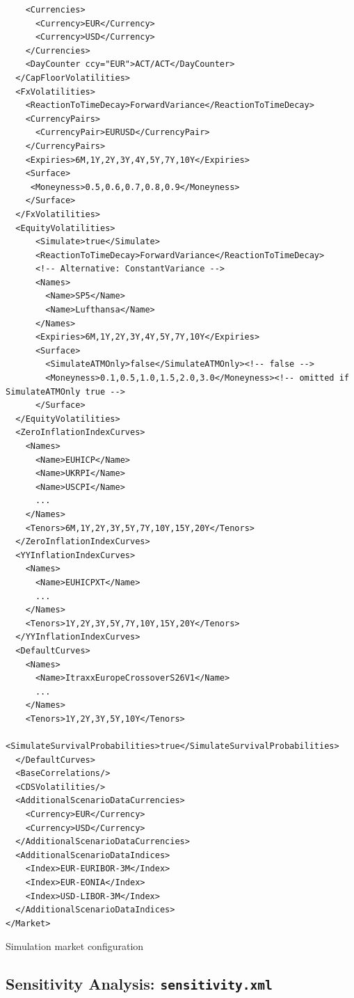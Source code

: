\documentclass[12pt, a4paper]{article}
\newenvironment{longlisting}{\captionsetup{type=listing}}{}
\begin{document}
\begin{longlisting}
\begin{verbatim}
    <Currencies>
      <Currency>EUR</Currency>
      <Currency>USD</Currency>
    </Currencies>
    <DayCounter ccy="EUR">ACT/ACT</DayCounter>
  </CapFloorVolatilities>
  <FxVolatilities>
    <ReactionToTimeDecay>ForwardVariance</ReactionToTimeDecay>
    <CurrencyPairs>
      <CurrencyPair>EURUSD</CurrencyPair>
    </CurrencyPairs>
    <Expiries>6M,1Y,2Y,3Y,4Y,5Y,7Y,10Y</Expiries>
    <Surface>
     <Moneyness>0.5,0.6,0.7,0.8,0.9</Moneyness>
    </Surface>
  </FxVolatilities>
  <EquityVolatilities>
      <Simulate>true</Simulate>
      <ReactionToTimeDecay>ForwardVariance</ReactionToTimeDecay>
      <!-- Alternative: ConstantVariance -->
      <Names>
        <Name>SP5</Name>
        <Name>Lufthansa</Name>
      </Names>
      <Expiries>6M,1Y,2Y,3Y,4Y,5Y,7Y,10Y</Expiries>
      <Surface>
        <SimulateATMOnly>false</SimulateATMOnly><!-- false -->
        <Moneyness>0.1,0.5,1.0,1.5,2.0,3.0</Moneyness><!-- omitted if SimulateATMOnly true -->
      </Surface>
  </EquityVolatilities>
  <ZeroInflationIndexCurves>
    <Names>
      <Name>EUHICP</Name>
      <Name>UKRPI</Name>
      <Name>USCPI</Name>
      ...
    </Names>
    <Tenors>6M,1Y,2Y,3Y,5Y,7Y,10Y,15Y,20Y</Tenors>
  </ZeroInflationIndexCurves>
  <YYInflationIndexCurves>
    <Names>
      <Name>EUHICPXT</Name>
      ...
    </Names>
    <Tenors>1Y,2Y,3Y,5Y,7Y,10Y,15Y,20Y</Tenors>
  </YYInflationIndexCurves>
  <DefaultCurves>
    <Names>
      <Name>ItraxxEuropeCrossoverS26V1</Name>
      ...
    </Names>
    <Tenors>1Y,2Y,3Y,5Y,10Y</Tenors>
    <SimulateSurvivalProbabilities>true</SimulateSurvivalProbabilities>
  </DefaultCurves>
  <BaseCorrelations/>
  <CDSVolatilities/>
  <AdditionalScenarioDataCurrencies>
    <Currency>EUR</Currency>
    <Currency>USD</Currency>
  </AdditionalScenarioDataCurrencies>
  <AdditionalScenarioDataIndices>
    <Index>EUR-EURIBOR-3M</Index>
    <Index>EUR-EONIA</Index>
    <Index>USD-LIBOR-3M</Index>
  </AdditionalScenarioDataIndices>
</Market>
\end{verbatim}
\caption{Simulation market configuration}
\label{lst:simulation_market_configuration}
\end{longlisting}


\subsection{Sensitivity Analysis: {\tt sensitivity.xml}}\label{sec:sensitivity}
\end{document}
